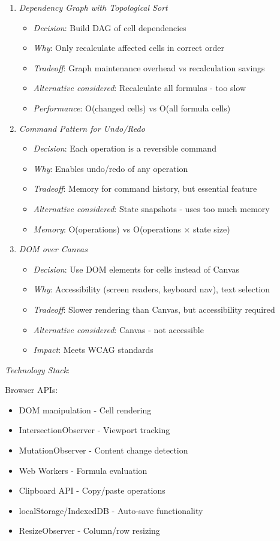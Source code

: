 \documentclass[11pt]{article}
\begin{document}
\begin{enumerate}
\item \emph{Dependency Graph with Topological Sort}

\begin{itemize}
\item \emph{Decision}: Build DAG of cell dependencies
\item \emph{Why}: Only recalculate affected cells in correct order
\item \emph{Tradeoff}: Graph maintenance overhead vs recalculation savings
\item \emph{Alternative considered}: Recalculate all formulas - too slow
\item \emph{Performance}: O(changed cells) vs O(all formula cells)
\end{itemize}

\item \emph{Command Pattern for Undo/Redo}

\begin{itemize}
\item \emph{Decision}: Each operation is a reversible command
\item \emph{Why}: Enables undo/redo of any operation
\item \emph{Tradeoff}: Memory for command history, but essential feature
\item \emph{Alternative considered}: State snapshots - uses too much memory
\item \emph{Memory}: O(operations) vs O(operations × state size)
\end{itemize}

\item \emph{DOM over Canvas}

\begin{itemize}
\item \emph{Decision}: Use DOM elements for cells instead of Canvas
\item \emph{Why}: Accessibility (screen readers, keyboard nav), text selection
\item \emph{Tradeoff}: Slower rendering than Canvas, but accessibility required
\item \emph{Alternative considered}: Canvas - not accessible
\item \emph{Impact}: Meets WCAG standards
\end{itemize}
\end{enumerate}

\emph{Technology Stack}:

Browser APIs:

\begin{itemize}
\item DOM manipulation - Cell rendering
\item IntersectionObserver - Viewport tracking
\item MutationObserver - Content change detection
\item Web Workers - Formula evaluation
\item Clipboard API - Copy/paste operations
\item localStorage/IndexedDB - Auto-save functionality
\item ResizeObserver - Column/row resizing
\end{itemize}
\end{document}
